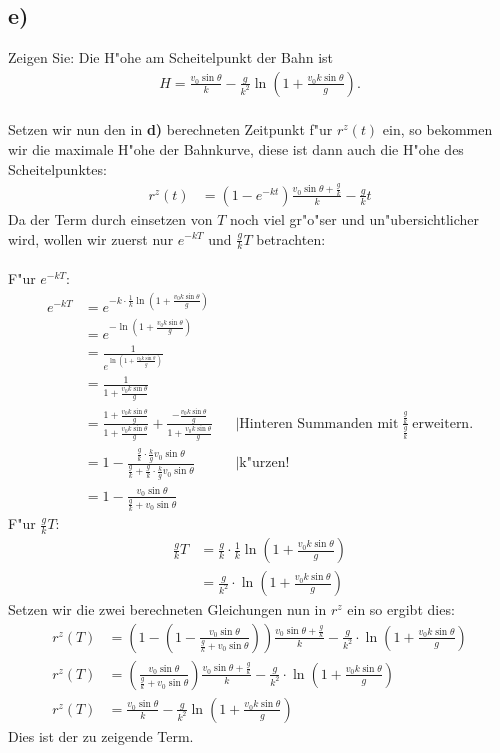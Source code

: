 \documentclass{theozettel}
\begin{document}
\subsection*{e)} Zeigen Sie: Die H"ohe am Scheitelpunkt der Bahn ist
\begin{align*}
H=\frac{v_0\sin\theta}{k}-\frac{g}{k^2}\ln\left(1+\frac{v_0k\sin\theta}{g}\right)\text{.}
\end{align*}\\
Setzen wir nun den in \textbf{d)} berechneten Zeitpunkt f"ur $r^z\left(t\right)$ ein, so bekommen wir die maximale H"ohe der Bahnkurve, diese ist dann auch die H"ohe des Scheitelpunktes:
\begin{align*}
r^z\left(t\right)&=\left(1-e^{-kt}\right)\frac{v_0\sin\theta +\frac{g}{k}}{k}-\frac{g}{k}t
\end{align*}
Da der Term durch einsetzen von $T$ noch viel gr"o"ser und un"ubersichtlicher wird, wollen wir zuerst nur  $e^{-kT}$ und $\frac{g}{k}T$ betrachten:\\\\
F"ur $e^{-kT}$:
\begin{align*}
e^{-kT}&=e^{-k\cdot\frac{1}{k}\ln\left(1+\frac{v_0k\sin\theta}{g}\right)}\\
&=e^{-\ln\left(1+\frac{v_0k\sin\theta}{g}\right)}\\
&=\frac{1}{e^{\ln\left(1+\frac{v_0k\sin\theta}{g}\right)}}\\
&=\frac{1}{1+\frac{v_0k\sin\theta}{g}}\\
&=\frac{1+\frac{v_0k\sin\theta}{g}}{1+\frac{v_0k\sin\theta}{g}}+\frac{-\frac{v_0k\sin\theta}{g}}{1+\frac{v_0k\sin\theta}{g}}&&|\text{Hinteren Summanden mit} \ \frac{\frac{g}{k}}{\frac{g}{k}} \ \text{erweitern.}\\
&=1-\frac{\frac{g}{k}\cdot\frac{k}{g}v_0\sin\theta}{\frac{g}{k}+\frac{g}{k}\cdot\frac{k}{g}v_0\sin\theta}&&|\text{k"urzen!}\\
&=1-\frac{v_0\sin\theta}{\frac{g}{k}+v_0\sin\theta}
\end{align*}
F"ur $\frac{g}{k}T$:
\begin{align*}
\frac{g}{k}T&=\frac{g}{k}\cdot\frac{1}{k}\ln\left(1+\frac{v_0k\sin\theta}{g}\right)\\
&=\frac{g}{k^2}\cdot\ln\left(1+\frac{v_0k\sin\theta}{g}\right)
\end{align*}
Setzen wir die zwei berechneten Gleichungen nun in $r^z$ ein so ergibt dies:
\begin{align*}
r^z\left(T\right)&=\left(1-\left(1-\frac{v_0\sin\theta}{\frac{g}{k}+v_0\sin\theta}\right)\right)\frac{v_0\sin\theta +\frac{g}{k}}{k}-\frac{g}{k^2}\cdot\ln\left(1+\frac{v_0k\sin\theta}{g}\right)\\
r^z\left(T\right)&=\left(\frac{v_0\sin\theta}{\frac{g}{k}+v_0\sin\theta}\right)\frac{v_0\sin\theta +\frac{g}{k}}{k}-\frac{g}{k^2}\cdot\ln\left(1+\frac{v_0k\sin\theta}{g}\right)\\
r^z\left(T\right)&=\frac{v_0\sin\theta}{k}-\frac{g}{k^2}\ln\left(1+\frac{v_0k\sin\theta}{g}\right)
\end{align*}
Dies ist der zu zeigende Term.
\newpage
\end{document}
